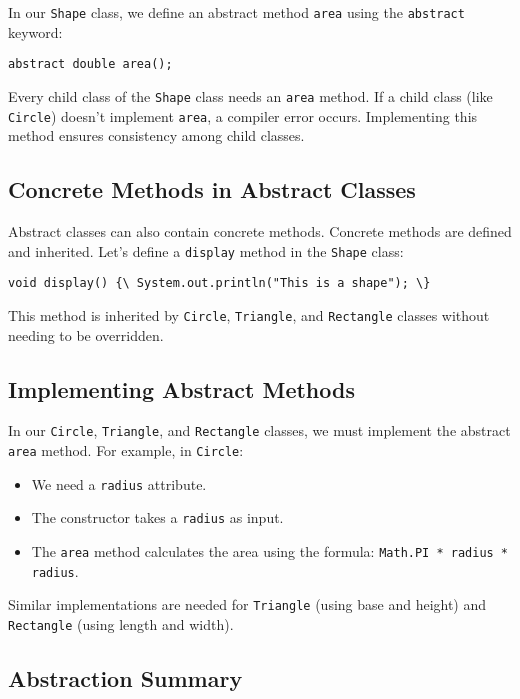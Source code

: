 \documentclass{article}
\begin{document}
In our \texttt{Shape} class, we define an abstract method \texttt{area} using the \texttt{abstract} keyword:

\texttt{abstract double area();}

Every child class of the \texttt{Shape} class needs an \texttt{area} method.  If a child class (like \texttt{Circle}) doesn't implement \texttt{area}, a compiler error occurs.  Implementing this method ensures consistency among child classes.

\subsection{Concrete Methods in Abstract Classes}

Abstract classes can also contain concrete methods.  Concrete methods are defined and inherited. Let's define a \texttt{display} method in the \texttt{Shape} class:

\texttt{void display() \{\textbackslash{} System.out.println("This is a shape"); \textbackslash{}\}}

This method is inherited by \texttt{Circle}, \texttt{Triangle}, and \texttt{Rectangle} classes without needing to be overridden.

\subsection{Implementing Abstract Methods}

In our \texttt{Circle}, \texttt{Triangle}, and \texttt{Rectangle} classes, we must implement the abstract \texttt{area} method. For example, in \texttt{Circle}:

\begin{itemize}
    \item We need a \texttt{radius} attribute.
    \item The constructor takes a \texttt{radius} as input.
    \item The \texttt{area} method calculates the area using the formula:  \texttt{Math.PI * radius * radius}.
\end{itemize}

Similar implementations are needed for \texttt{Triangle} (using base and height) and \texttt{Rectangle} (using length and width).

\subsection{Abstraction Summary}
\end{document}
